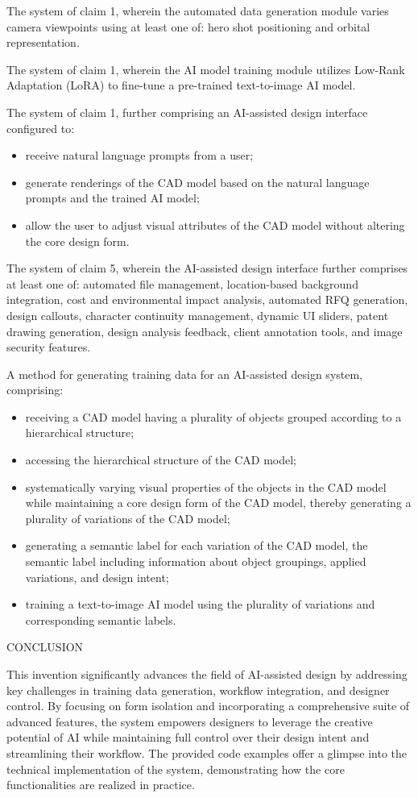 \documentclass[12pt]{report}
\begin{document}
The system of claim 1, wherein the automated data generation module varies camera viewpoints using at least one of: hero shot positioning and orbital representation.

The system of claim 1, wherein the AI model training module utilizes Low-Rank Adaptation (LoRA) to fine-tune a pre-trained text-to-image AI model.

The system of claim 1, further comprising an AI-assisted design interface configured to:
\begin{itemize}
    \item receive natural language prompts from a user;
    \item generate renderings of the CAD model based on the natural language prompts and the trained AI model;
    \item allow the user to adjust visual attributes of the CAD model without altering the core design form.
\end{itemize}

The system of claim 5, wherein the AI-assisted design interface further comprises at least one of: automated file management, location-based background integration, cost and environmental impact analysis, automated RFQ generation, design callouts, character continuity management, dynamic UI sliders, patent drawing generation, design analysis feedback, client annotation tools, and image security features.

A method for generating training data for an AI-assisted design system, comprising:
\begin{itemize}
    \item receiving a CAD model having a plurality of objects grouped according to a hierarchical structure;
    \item accessing the hierarchical structure of the CAD model;
    \item systematically varying visual properties of the objects in the CAD model while maintaining a core design form of the CAD model, thereby generating a plurality of variations of the CAD model;
    \item generating a semantic label for each variation of the CAD model, the semantic label including information about object groupings, applied variations, and design intent;
    \item training a text-to-image AI model using the plurality of variations and corresponding semantic labels.
\end{itemize}

\begin{center}
CONCLUSION
\end{center}

This invention significantly advances the field of AI-assisted design by addressing key challenges in training data generation, workflow integration, and designer control. By focusing on form isolation and incorporating a comprehensive suite of advanced features, the system empowers designers to leverage the creative potential of AI while maintaining full control over their design intent and streamlining their workflow. The provided code examples offer a glimpse into the technical implementation of the system, demonstrating how the core functionalities are realized in practice. 
\end{document}
